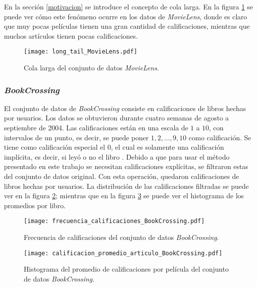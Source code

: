 En la sección \ref{motivacion} se introduce el concepto de cola larga. En la figura \ref{fig:ML_long_tail} se puede ver cómo este fenómeno ocurre en los datos de \textit{MovieLens}, donde es claro que muy pocas películas tienen una gran cantidad de calificaciones, mientras que muchos artículos tienen pocas calificaciones.

\begin{figure}[H]
	\centering
 	\texttt{[image: long\_tail\_MovieLens.pdf]}
 	\caption{Cola larga del conjunto de datos \textit{MovieLens}.}
 	\label{fig:ML_long_tail}
\end{figure}


\subsubsection{\textit{BookCrossing}}

El conjunto de datos de \textit{BookCrossing} consiste en  calificaciones de  libros hechas por  usuarios. Los datos se obtuvieron durante cuatro semanas de agosto a septiembre de 2004. Las calificaciones están en una escala de $1$ a $10$, con intervalos de un punto, es decir, se puede poner $1, 2, \hdots, 9, 10$ como calificación. Se tiene como calificación especial el $0$, el cual es solamente una calificación implícita, es decir, si leyó o no el libro \cite{ziegler2005improving}. Debido a que para usar el método presentado en este trabajo se necesitan calificaciones explícitas, se filtraron estas del conjunto de datos original. Con esta operación, quedaron  calificaciones de  libros hechas por  usuarios. La distribución de las calificaciones filtradas se puede ver en la figura \ref{fig:BC_frec_calificaciones}; mientras que en la figura \ref{fig:BC_hist_prom_cals} se puede ver el histograma de los promedios por libro.

\begin{figure}[H]
	\centering
 	\texttt{[image: frecuencia\_calificaciones\_BookCrossing.pdf]}
 	\caption{Frecuencia de calificaciones del conjunto de datos \textit{BookCrossing}.}
 	\label{fig:BC_frec_calificaciones}
\end{figure}

\begin{figure}[H]
	\centering
 	\texttt{[image: calificacion\_promedio\_articulo\_BookCrossing.pdf]}
 	\caption{Histograma del promedio de calificaciones por película del conjunto de datos \textit{BookCrossing}.}
 	\label{fig:BC_hist_prom_cals}
\end{figure}

